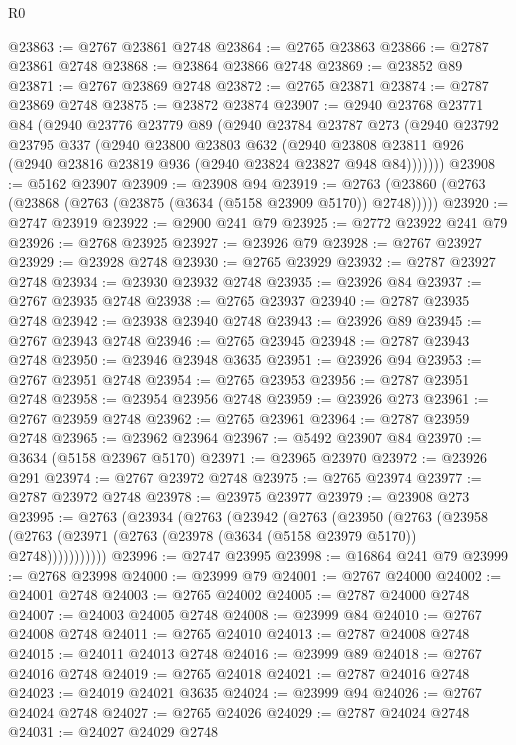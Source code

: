 \begin{lexlean}{R0}
\begin{coremodule}
@23863 := @2767 @23861 @2748
@23864 := @2765 @23863
@23866 := @2787 @23861 @2748
@23868 := @23864 @23866 @2748
@23869 := @23852 @89
@23871 := @2767 @23869 @2748
@23872 := @2765 @23871
@23874 := @2787 @23869 @2748
@23875 := @23872 @23874
@23907 := @2940
    @23768
    @23771
    @84
    (@2940
      @23776
      @23779
      @89
      (@2940
        @23784
        @23787
        @273
        (@2940
          @23792
          @23795
          @337
          (@2940
            @23800
            @23803
            @632
            (@2940 @23808 @23811 @926 (@2940 @23816 @23819 @936 (@2940 @23824 @23827 @948 @84)))))))
@23908 := @5162 @23907
@23909 := @23908 @94
@23919 := @2763 (@23860 (@2763 (@23868 (@2763 (@23875 (@3634 (@5158 @23909 @5170)) @2748)))))
@23920 := @2747 @23919
@23922 := @2900 @241 @79
@23925 := @2772 @23922 @241 @79
@23926 := @2768 @23925
@23927 := @23926 @79
@23928 := @2767 @23927
@23929 := @23928 @2748
@23930 := @2765 @23929
@23932 := @2787 @23927 @2748
@23934 := @23930 @23932 @2748
@23935 := @23926 @84
@23937 := @2767 @23935 @2748
@23938 := @2765 @23937
@23940 := @2787 @23935 @2748
@23942 := @23938 @23940 @2748
@23943 := @23926 @89
@23945 := @2767 @23943 @2748
@23946 := @2765 @23945
@23948 := @2787 @23943 @2748
@23950 := @23946 @23948 @3635
@23951 := @23926 @94
@23953 := @2767 @23951 @2748
@23954 := @2765 @23953
@23956 := @2787 @23951 @2748
@23958 := @23954 @23956 @2748
@23959 := @23926 @273
@23961 := @2767 @23959 @2748
@23962 := @2765 @23961
@23964 := @2787 @23959 @2748
@23965 := @23962 @23964
@23967 := @5492 @23907 @84
@23970 := @3634 (@5158 @23967 @5170)
@23971 := @23965 @23970
@23972 := @23926 @291
@23974 := @2767 @23972 @2748
@23975 := @2765 @23974
@23977 := @2787 @23972 @2748
@23978 := @23975 @23977
@23979 := @23908 @273
@23995 := @2763
    (@23934
      (@2763
        (@23942
          (@2763
            (@23950
              (@2763
                (@23958 (@2763 (@23971 (@2763 (@23978 (@3634 (@5158 @23979 @5170)) @2748)))))))))))
@23996 := @2747 @23995
@23998 := @16864 @241 @79
@23999 := @2768 @23998
@24000 := @23999 @79
@24001 := @2767 @24000
@24002 := @24001 @2748
@24003 := @2765 @24002
@24005 := @2787 @24000 @2748
@24007 := @24003 @24005 @2748
@24008 := @23999 @84
@24010 := @2767 @24008 @2748
@24011 := @2765 @24010
@24013 := @2787 @24008 @2748
@24015 := @24011 @24013 @2748
@24016 := @23999 @89
@24018 := @2767 @24016 @2748
@24019 := @2765 @24018
@24021 := @2787 @24016 @2748
@24023 := @24019 @24021 @3635
@24024 := @23999 @94
@24026 := @2767 @24024 @2748
@24027 := @2765 @24026
@24029 := @2787 @24024 @2748
@24031 := @24027 @24029 @2748

\end{coremodule}
\end{lexlean}
